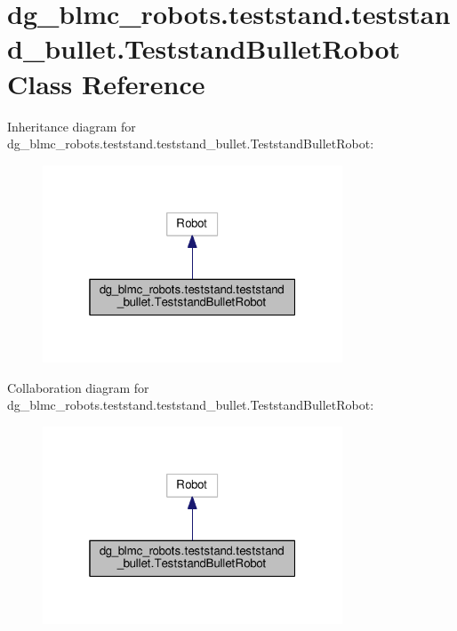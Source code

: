 \hypertarget{classdg__blmc__robots_1_1teststand_1_1teststand__bullet_1_1TeststandBulletRobot}{}\section{dg\+\_\+blmc\+\_\+robots.\+teststand.\+teststand\+\_\+bullet.\+Teststand\+Bullet\+Robot Class Reference}
\label{classdg__blmc__robots_1_1teststand_1_1teststand__bullet_1_1TeststandBulletRobot}


Inheritance diagram for dg\+\_\+blmc\+\_\+robots.\+teststand.\+teststand\+\_\+bullet.\+Teststand\+Bullet\+Robot\+:
\nopagebreak
\begin{figure}[H]
\begin{center}
\leavevmode
\includegraphics[width=253pt]{classdg__blmc__robots_1_1teststand_1_1teststand__bullet_1_1TeststandBulletRobot__inherit__graph}
\end{center}
\end{figure}


Collaboration diagram for dg\+\_\+blmc\+\_\+robots.\+teststand.\+teststand\+\_\+bullet.\+Teststand\+Bullet\+Robot\+:
\nopagebreak
\begin{figure}[H]
\begin{center}
\leavevmode
\includegraphics[width=253pt]{classdg__blmc__robots_1_1teststand_1_1teststand__bullet_1_1TeststandBulletRobot__coll__graph}
\end{center}
\end{figure}
